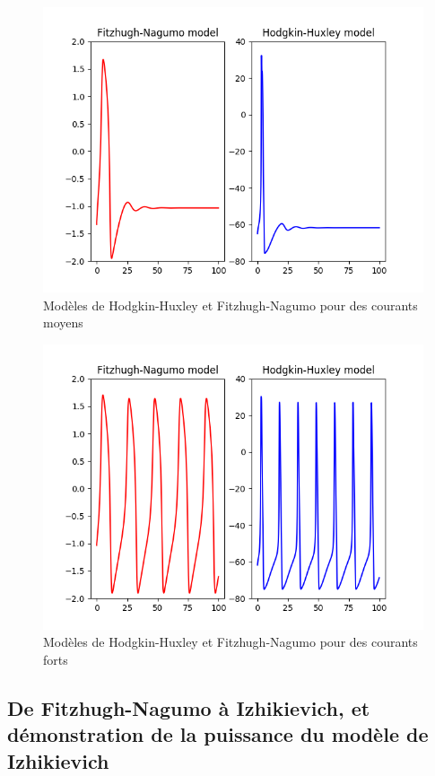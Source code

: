 \documentclass[12pt]{scrartcl}
\begin{document}
\clearpage
\begin{figure}[!h]
\centering
\includegraphics[scale=0.5]{imgs/hhfhnmoyen.png}
\caption{Modèles de Hodgkin-Huxley et Fitzhugh-Nagumo pour des courants moyens}
\label{hhfhnmoyen}
\end{figure}

\begin{figure}[!h]
\centering
\includegraphics[scale=0.5]{imgs/hhfhnfort.png}
\caption{Modèles de Hodgkin-Huxley et Fitzhugh-Nagumo pour des courants forts}
\label{hhfhnfort}
\end{figure}

\subsection{De Fitzhugh-Nagumo à Izhikievich, et démonstration de la puissance du modèle de Izhikievich}
\end{document}
